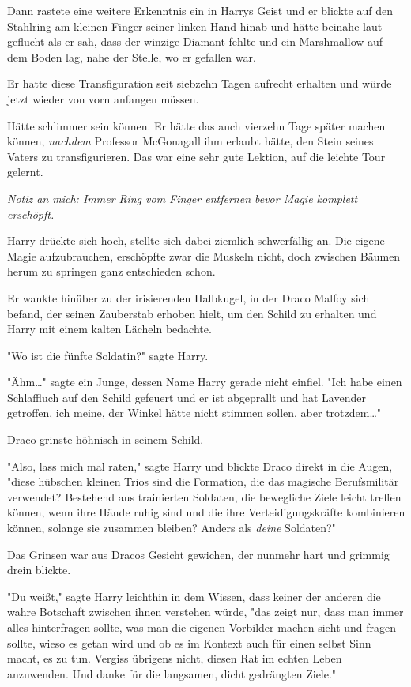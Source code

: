 {Dann rastete eine weitere Erkenntnis ein in Harrys Geist und er blickte auf den Stahlring am kleinen Finger seiner linken Hand hinab und hätte beinahe laut geflucht als er sah, dass der winzige Diamant fehlte und ein Marshmallow auf dem Boden lag, nahe der Stelle, wo er gefallen war.

Er hatte diese Transfiguration seit siebzehn Tagen aufrecht erhalten und würde jetzt wieder von vorn anfangen müssen.

Hätte schlimmer sein können. Er hätte das auch vierzehn Tage später machen können, \emph{nachdem} Professor McGonagall ihm erlaubt hätte, den Stein seines Vaters zu transfigurieren. Das war eine sehr gute Lektion, auf die leichte Tour gelernt.

\emph{Notiz an mich: Immer Ring vom Finger entfernen bevor Magie komplett erschöpft.}

Harry drückte sich hoch, stellte sich dabei ziemlich schwerfällig an. Die eigene Magie aufzubrauchen, erschöpfte zwar die Muskeln nicht, doch zwischen Bäumen herum zu springen ganz entschieden schon.

Er wankte hinüber zu der irisierenden Halbkugel, in der Draco Malfoy sich befand, der seinen Zauberstab erhoben hielt, um den Schild zu erhalten und Harry mit einem kalten Lächeln bedachte.

"Wo ist die fünfte Soldatin?" sagte Harry.

"Ähm…" sagte ein Junge, dessen Name Harry gerade nicht einfiel. "Ich habe einen Schlaffluch auf den Schild gefeuert und er ist abgeprallt und hat Lavender getroffen, ich meine, der Winkel hätte nicht stimmen sollen, aber trotzdem…"

Draco grinste höhnisch in seinem Schild.

"Also, lass mich mal raten," sagte Harry und blickte Draco direkt in die Augen, "diese hübschen kleinen Trios sind die Formation, die das magische Berufsmilitär verwendet? Bestehend aus trainierten Soldaten, die bewegliche Ziele leicht treffen können, wenn ihre Hände ruhig sind und die ihre Verteidigungskräfte kombinieren können, solange sie zusammen bleiben? Anders als \emph{deine} Soldaten?"

Das Grinsen war aus Dracos Gesicht gewichen, der nunmehr hart und grimmig drein blickte.

"Du weißt," sagte Harry leichthin in dem Wissen, dass keiner der anderen die wahre Botschaft zwischen ihnen verstehen würde, "das zeigt nur, dass man immer alles hinterfragen sollte, was man die eigenen Vorbilder machen sieht und fragen sollte, wieso es getan wird und ob es im Kontext auch für einen selbst Sinn macht, es zu tun. Vergiss übrigens nicht, diesen Rat im echten Leben anzuwenden. Und danke für die langsamen, dicht gedrängten Ziele."

}
